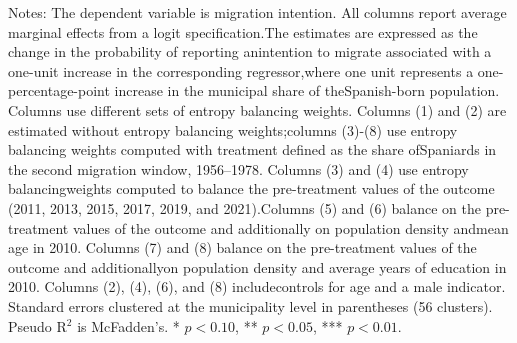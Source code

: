 \begin{table}[!h]
\caption*{\footnotesize Notes: The dependent variable is migration intention. All columns report average marginal effects from a logit specification.The estimates are expressed as the change in the probability of reporting anintention to migrate associated with a one-unit increase in the corresponding regressor,where one unit represents a one-percentage-point increase in the municipal share of theSpanish-born population. Columns use different sets of entropy balancing weights. Columns (1) and (2) are estimated without entropy balancing weights;columns (3)-(8) use entropy balancing weights computed with treatment defined as the share ofSpaniards in the second migration window, 1956–1978. Columns (3) and (4) use entropy balancingweights computed to balance the pre-treatment values of the outcome (2011, 2013, 2015, 2017, 2019, and 2021).Columns (5) and (6) balance on the pre-treatment values of the outcome and additionally on population density andmean age in 2010. Columns (7) and (8) balance on the pre-treatment values of the outcome and additionallyon population density and average years of education in 2010. Columns (2), (4), (6), and (8) includecontrols for age and a male indicator. Standard errors clustered at the municipality level in parentheses (56 clusters). Pseudo R$^2$ is McFadden's. * $p<0.10$, ** $p<0.05$, *** $p<0.01$.}
\end{table}
